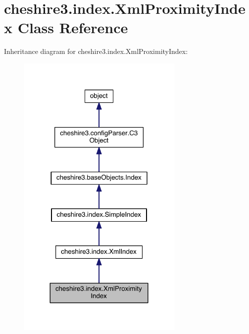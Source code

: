 \hypertarget{classcheshire3_1_1index_1_1_xml_proximity_index}{\section{cheshire3.\-index.\-Xml\-Proximity\-Index Class Reference}
\label{classcheshire3_1_1index_1_1_xml_proximity_index}
}


Inheritance diagram for cheshire3.\-index.\-Xml\-Proximity\-Index\-:
\nopagebreak
\begin{figure}[H]
\begin{center}
\leavevmode
\includegraphics[width=228pt]{classcheshire3_1_1index_1_1_xml_proximity_index__inherit__graph}
\end{center}
\end{figure}


